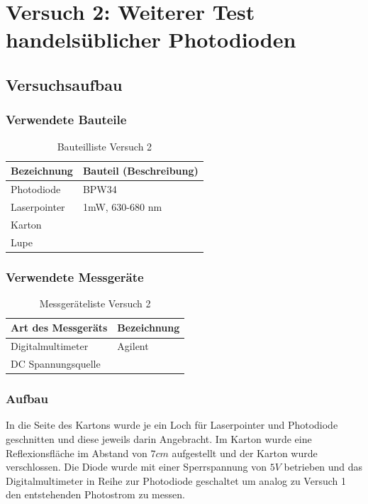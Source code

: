 \section{Versuch 2: Weiterer Test handelsüblicher Photodioden}
\subsection{Versuchsaufbau}
\subsubsection{Verwendete Bauteile}
\begin{table}[H]
	\centering
	\caption{Bauteilliste Versuch 2}
	\begin{tabular}{|l|l|}
		\hline
		\textbf{Bezeichnung} & \textbf{Bauteil (Beschreibung)}
		\\\hline
		Photodiode & BPW34
		\\\hline
		Laserpointer & 1mW, 630-680 nm
		\\\hline
		Karton & 
		\\\hline
		Lupe &
		\\\hline
	\end{tabular}
\end{table}

\subsubsection{Verwendete Messgeräte}
\begin{table}[H]
	\centering
	\caption{Messgeräteliste Versuch 2}
	\begin{tabular}{|l|l|}
		\hline
		\textbf{Art des Messgeräts} & \textbf{Bezeichnung}
		\\\hline
		Digitalmultimeter & Agilent
		\\\hline
		DC Spannungsquelle & 
		\\\hline
	\end{tabular}
\end{table}
\subsubsection{Aufbau}
In die Seite des Kartons wurde je ein Loch für Laserpointer und Photodiode geschnitten und diese jeweils darin Angebracht. Im Karton wurde eine Reflexionsfläche im Abstand von $7cm$ aufgestellt und der Karton wurde verschlossen. Die Diode wurde mit einer Sperrspannung von $5V$ betrieben und das Digitalmultimeter in Reihe zur Photodiode geschaltet um analog zu Versuch 1 den entstehenden Photostrom zu messen. 
